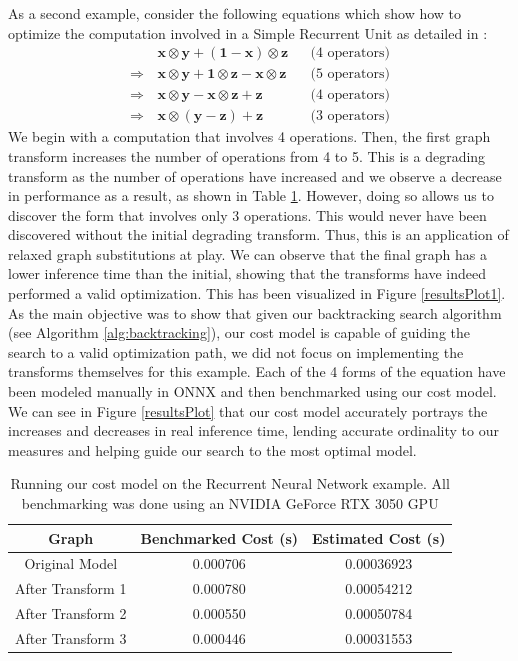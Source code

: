 \documentclass[12pt,a4paper,twoside,openright,bibliography=totocnumbered]{report}
\begin{document}
As a second example, consider the following equations which show how to optimize the computation involved in a Simple Recurrent Unit as detailed in \cite{jia2019}:
\begin{align*}
&\mathbf{x} \otimes \mathbf{y} + (\mathbf{1} - \mathbf{x}) \otimes \mathbf{z} && \text{(4 operators)} \\
\Rightarrow \, &\mathbf{x} \otimes \mathbf{y} + \mathbf{1} \otimes \mathbf{z} - \mathbf{x} \otimes \mathbf{z} && \text{(5 operators)} \\
\Rightarrow \, &\mathbf{x} \otimes \mathbf{y} - \mathbf{x} \otimes \mathbf{z} + \mathbf{z} && \text{(4 operators)} \\
\Rightarrow \, &\mathbf{x} \otimes (\mathbf{y} - \mathbf{z}) + \mathbf{z} && \text{(3 operators)}
\end{align*}
We begin with a computation that involves 4 operations. Then, the first graph transform increases the number of operations from 4 to 5. This is a degrading transform as the number of operations have increased and we observe a decrease in performance as a result, as shown in Table \ref{resultsTab1}.  However, doing so allows us to discover the form that involves only 3 operations. This would never have been discovered without the initial degrading transform. Thus, this is an application of relaxed graph substitutions at play. We can observe that the final graph has a lower inference time than the initial, showing that the transforms have indeed performed a valid optimization. This has been visualized in Figure \ref{resultsPlot1}.\\
As the main objective was to show that given our backtracking search algorithm (see Algorithm \ref{alg:backtracking}), our cost model is capable of guiding the search to a valid optimization path, we did not focus on implementing the transforms themselves for this example. Each of the 4 forms of the equation have been modeled manually in ONNX and then benchmarked using our cost model. We can see in Figure \ref{resultsPlot} that our cost model accurately portrays the increases and decreases in real inference time, lending accurate ordinality to our measures and helping guide our search to the most optimal model.\\
\begin{table}
        \centering
            \begin{tabular}{|c|c|c|}
                \hline
                Graph & Benchmarked Cost (s) & Estimated Cost (s)\\
                \hline
                Original Model & 0.000706 & 0.00036923 \\
                After Transform 1 & 0.000780 & 0.00054212 \\
                After Transform 2 & 0.000550 & 0.00050784 \\
                After Transform 3 & 0.000446 & 0.00031553 \\
                \hline
            \end{tabular}
            \caption{Running our cost model on the Recurrent Neural Network example. All benchmarking was done using an NVIDIA GeForce RTX 3050 GPU}
            \label{resultsTab1}
\end{table}
\end{document}
